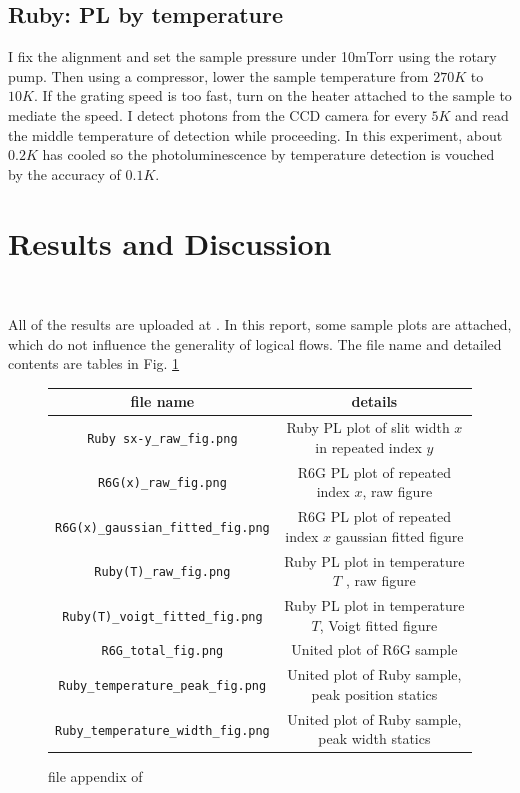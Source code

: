 \documentclass{article}
\begin{document}
\subsection{Ruby: PL by temperature}
 I fix the alignment and set the sample pressure under 10mTorr using the rotary pump.
 Then using a compressor, lower the sample temperature from $270K$ to $10K$.
 If the grating speed is too fast, turn on the heater attached to the sample to mediate the speed.
 I detect photons from the CCD camera for every $5K$ and read the middle temperature of detection while proceeding.
 In this experiment, about $0.2K$ has cooled so the photoluminescence by temperature detection is vouched by the accuracy of $0.1K$.


\section{Results and Discussion}\

All of the results are uploaded at \cite{github_results}.
In this report, some sample plots are attached, which do not influence the generality of logical flows.
The file name and detailed contents are tables in Fig. \ref{fig:file_appendix}

\begin{figure}[H]
  \centering
  \begin{tabular}{|c|c|}
      file name  & details \\
      \hline
      \verb|Ruby sx-y_raw_fig.png| & Ruby PL plot of slit width $x$ in repeated index $y$\\
      \verb|R6G(x)_raw_fig.png| & R6G PL plot of repeated index $x$, raw figure\\
      \verb|R6G(x)_gaussian_fitted_fig.png| & R6G PL plot of repeated index $x$ gaussian fitted figure\\
      \verb|Ruby(T)_raw_fig.png| & Ruby PL plot in temperature $T$ , raw  figure\\
      \verb|Ruby(T)_voigt_fitted_fig.png| & Ruby PL plot in temperature $T$, Voigt fitted figure\\
      \verb|R6G_total_fig.png| & United plot of R6G sample\\
      \verb|Ruby_temperature_peak_fig.png| & United plot of Ruby sample, peak position statics\\
      \verb|Ruby_temperature_width_fig.png| & United plot of Ruby sample, peak width statics\\

  \end{tabular}
  \caption{file appendix of \cite{github_results}}
  \label{fig:file_appendix}
\end{figure}
\end{document}
